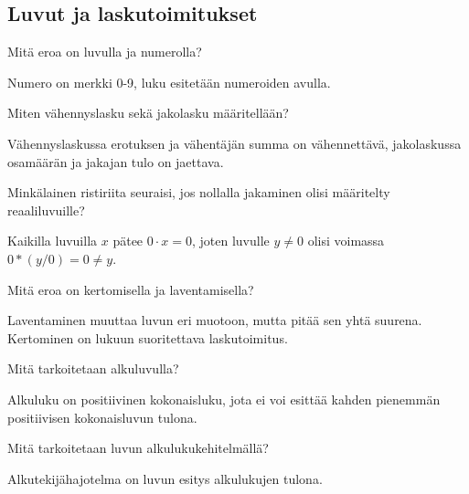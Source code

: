 \subsection*{Luvut ja laskutoimitukset}

\begin{tehtava}
Mitä eroa on luvulla ja numerolla?
\begin{vastaus}
Numero on merkki 0-9, luku esitetään numeroiden avulla.
\end{vastaus}
\end{tehtava}

\begin{tehtava}
Miten vähennyslasku sekä jakolasku määritellään?
\begin{vastaus}
Vähennyslaskussa erotuksen ja vähentäjän summa on vähennettävä, jakolaskussa osamäärän
ja jakajan tulo on jaettava.
\end{vastaus}
\end{tehtava}

\begin{tehtava}
Minkälainen ristiriita seuraisi, jos nollalla jakaminen olisi määritelty reaaliluvuille?
\begin{vastaus}
Kaikilla luvuilla $x$ pätee $0 \cdot x = 0$, joten luvulle $y \neq 0$ olisi voimassa $0 * (y/0) = 0 \neq y$.
\end{vastaus}
\end{tehtava}

\begin{tehtava}
Mitä eroa on kertomisella ja laventamisella?
\begin{vastaus}
Laventaminen muuttaa luvun eri muotoon, mutta pitää sen yhtä suurena. Kertominen on lukuun
suoritettava laskutoimitus.
\end{vastaus}
\end{tehtava}

\begin{tehtava}
Mitä tarkoitetaan alkuluvulla?
\begin{vastaus}
Alkuluku on positiivinen kokonaisluku, jota ei voi esittää kahden pienemmän positiivisen kokonaisluvun tulona.
\end{vastaus}
\end{tehtava}

\begin{tehtava}
Mitä tarkoitetaan luvun alkulukukehitelmällä?
\begin{vastaus}
Alkutekijähajotelma on luvun esitys alkulukujen tulona.
\end{vastaus}
\end{tehtava}

